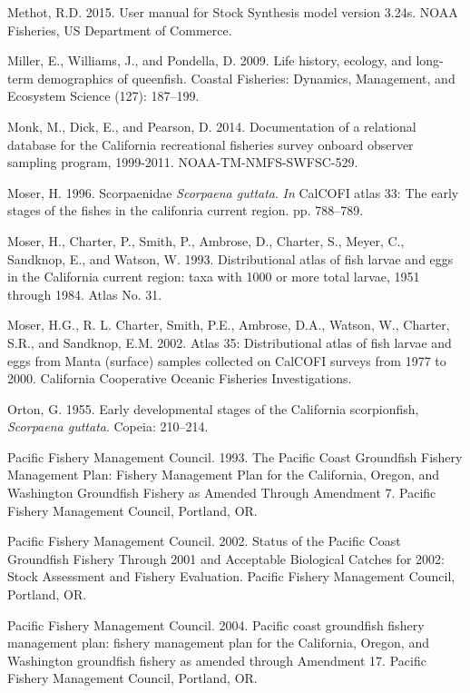 \documentclass[12pt,]{article}
\begin{document}
\hypertarget{ref-Methot2015}{}
Methot, R.D. 2015. User manual for Stock Synthesis model version 3.24s.
NOAA Fisheries, US Department of Commerce.

\hypertarget{ref-Miller2009}{}
Miller, E., Williams, J., and Pondella, D. 2009. Life history, ecology,
and long-term demographics of queenfish. Coastal Fisheries: Dynamics,
Management, and Ecosystem Science (127): 187--199.

\hypertarget{ref-Monk2014}{}
Monk, M., Dick, E., and Pearson, D. 2014. Documentation of a relational
database for the California recreational fisheries survey onboard
observer sampling program, 1999-2011. NOAA-TM-NMFS-SWFSC-529.

\hypertarget{ref-Moser1996}{}
Moser, H. 1996. Scorpaenidae \emph{Scorpaena guttata}. \emph{In} CalCOFI
atlas 33: The early stages of the fishes in the califonria current
region. pp. 788--789.

\hypertarget{ref-Moser1993}{}
Moser, H., Charter, P., Smith, P., Ambrose, D., Charter, S., Meyer, C.,
Sandknop, E., and Watson, W. 1993. Distributional atlas of fish larvae
and eggs in the California current region: taxa with 1000 or more total
larvae, 1951 through 1984. Atlas No. 31.

\hypertarget{ref-Moser2002}{}
Moser, H.G., R. L. Charter, Smith, P.E., Ambrose, D.A., Watson, W.,
Charter, S.R., and Sandknop, E.M. 2002. Atlas 35: Distributional atlas
of fish larvae and eggs from Manta (surface) samples collected on
CalCOFI surveys from 1977 to 2000. California Cooperative Oceanic
Fisheries Investigations.

\hypertarget{ref-Orton1955}{}
Orton, G. 1955. Early developmental stages of the California
scorpionfish, \emph{Scorpaena guttata}. Copeia: 210--214.

\hypertarget{ref-PFMC1993}{}
Pacific Fishery Management Council. 1993. The Pacific Coast Groundfish
Fishery Management Plan: Fishery Management Plan for the California,
Oregon, and Washington Groundfish Fishery as Amended Through Amendment
7. Pacific Fishery Management Council, Portland, OR.

\hypertarget{ref-PFMC2002}{}
Pacific Fishery Management Council. 2002. Status of the Pacific Coast
Groundfish Fishery Through 2001 and Acceptable Biological Catches for
2002: Stock Assessment and Fishery Evaluation. Pacific Fishery
Management Council, Portland, OR.

\hypertarget{ref-PFMC2004}{}
Pacific Fishery Management Council. 2004. Pacific coast groundfish
fishery management plan: fishery management plan for the California,
Oregon, and Washington groundfish fishery as amended through Amendment
17. Pacific Fishery Management Council, Portland, OR.
\end{document}
